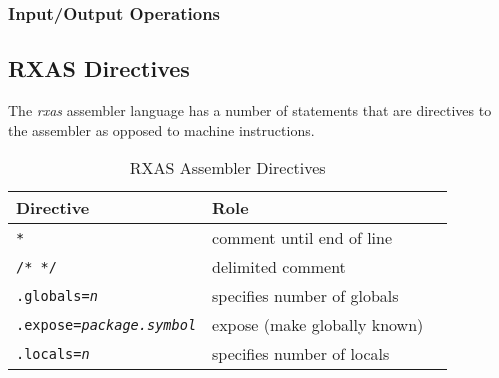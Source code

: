 \documentclass[english,11pt,twoside,toc=bib,toc=idx]{scrreprt}
\newcommand{\ARCH}{z/\kern-1pt Ar\-chi\-tec\-ture}
\newcommand{\ARCHarch}{\ARCH}
\newcommand{\ARCH}{ESA/390}
\newcommand{\ARCHarch}{the \ARCH{} ar\-chi\-tec\-ture}
\newenvironment{DIFnomarkup}{}{} %
\begin{document}
\subsubsection{Input/Output Operations}

\subsection{RXAS Directives}

The \emph{rxas} assembler language has a number of statements that are
directives to the assembler as opposed to machine instructions.

\begin{table}
  \centering
  \begin{DIFnomarkup}
  \begin{threeparttable}
    \begin{tabularx}{\textwidth}{lXl}
      \toprule
      Directive & Role &  \\
      \midrule
      \texttt{*} & comment until end of line & \\
      \texttt{/* */} & delimited comment & \\
      \texttt{.globals=\emph{n}} & specifies number of globals & \\
      \texttt{.expose=\emph{package.symbol}} & expose (make globally known) & \\
      \texttt{.locals=\emph{n}} &  specifies number of locals & \\
      \bottomrule
    \end{tabularx}
    \medskip
  \end{threeparttable}
  \end{DIFnomarkup}
  \caption{RXAS Assembler Directives}
  \label{tab:rxasdirectives}
\end{table}



\end{document}
